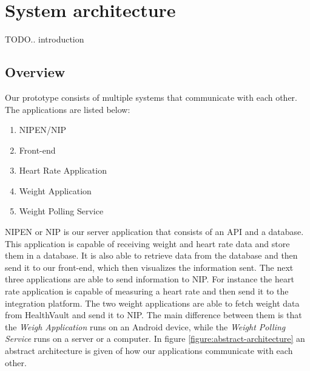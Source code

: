 \chapter{System architecture}
\label{ch:architecture}


TODO.. introduction


\section{Overview}

Our prototype consists of multiple systems that communicate with each other.
The applications are listed below:

\begin{enumerate}
	\item NIPEN/NIP
	\item Front-end
	\item Heart Rate Application
	\item Weight Application
	\item Weight Polling Service
\end{enumerate}

NIPEN or NIP is our server application that consists of an API and a database.
This application is capable of receiving weight and heart rate data and store them in a database.
It is also able to retrieve data from the database and then send it to our front-end, which then visualizes the information sent.
The next three applications are able to send information to NIP.
For instance the heart rate application is capable of measuring a heart rate and then send it to the integration platform.
The two weight applications are able to fetch weight data from HealthVault and send it to NIP.
The main difference between them is that the \textit{Weigh Application} runs on an Android device, while the \textit{Weight Polling Service} runs on a server or a computer.
In figure \ref{figure:abstract-architecture} an abstract architecture is given of how our applications communicate with each other.

